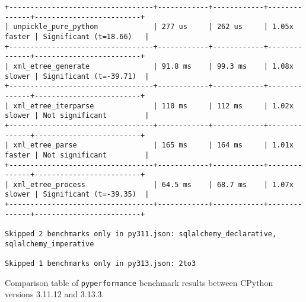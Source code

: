 \begin{code}
\begin{verbatim}
+----------------------------------+------------+------------+--------------+-------------------------+
| unpickle_pure_python             | 277 us     | 262 us     | 1.05x faster | Significant (t=18.66)   |
+----------------------------------+------------+------------+--------------+-------------------------+
| xml_etree_generate               | 91.8 ms    | 99.3 ms    | 1.08x slower | Significant (t=-39.71)  |
+----------------------------------+------------+------------+--------------+-------------------------+
| xml_etree_iterparse              | 110 ms     | 112 ms     | 1.02x slower | Not significant         |
+----------------------------------+------------+------------+--------------+-------------------------+
| xml_etree_parse                  | 165 ms     | 164 ms     | 1.01x faster | Not significant         |
+----------------------------------+------------+------------+--------------+-------------------------+
| xml_etree_process                | 64.5 ms    | 68.7 ms    | 1.07x slower | Significant (t=-39.35)  |
+----------------------------------+------------+------------+--------------+-------------------------+

Skipped 2 benchmarks only in py311.json: sqlalchemy_declarative, sqlalchemy_imperative

Skipped 1 benchmarks only in py313.json: 2to3
    \end{verbatim}
    \caption{Comparison table of \texttt{pyperformance} benchmark results between CPython versions 3.11.12 and 3.13.3.}
    \label{listing:pyperformance-results-311-313}
\end{code}

